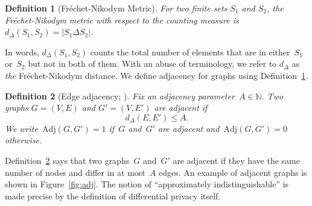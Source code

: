 \documentclass[conference]{ieeeconf}
\newtheorem{definition}{Definition}
\newcommand{\FN}{Fr\'echet-Nikodym }
\newcommand{\Adj}{\mathrm{Adj}}
\newcommand{\uti}{d_\Delta}
\begin{document}
\begin{definition}[\FN Metric]\label{def:FN}
    For two finite sets $S_1$ and $S_2$, the \FN metric with respect to the counting measure is
        $\uti(S_1, S_2)=|S_1 \Delta S_2|$.
\end{definition}

In words, $d_{\Delta}(S_1, S_2)$ counts the total number of elements
that are in either~$S_1$ or~$S_2$ but not in both of them. 
With an abuse of terminology, we refer to $\uti$ as \emph{the} \FN distance. We define adjacency for graphs
using Definition~\ref{def:FN}. 

\begin{definition}[{Edge adjacency; \cite{hay2009accurate}}]\label{def:adj}
    Fix an adjacency parameter~$A\in\mathbb{N}.$ Two graphs $G=(V,E)$ and $G' =(V,E')$ are adjacent if
    \begin{equation}
    \uti(E,E')\leq A.
    \end{equation}
    We write~$\Adj(G,G') = 1$ if~$G$ and~$G'$ are adjacent and~$\Adj(G, G')=0$ otherwise.
\end{definition}

Definition~\ref{def:adj} says that two graphs~$G$ and~$G'$ are adjacent if they 
have the same number of nodes and 
differ in at most~$A$ edges. An example of adjacent graphs is shown in Figure~\ref{fig:adj}.
The notion of ``approximately indistinguishable'' is made precise by the definition of differential privacy itself.
\end{document}
